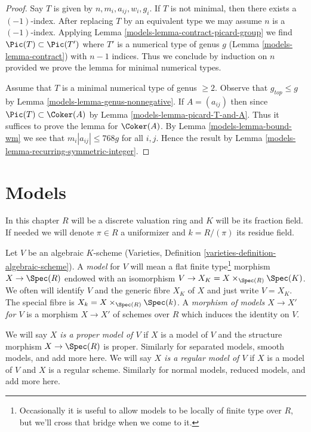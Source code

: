 \begin{proof}

Say $T$ is given by $n, m_i, a_{ij}, w_i, g_i$.
If $T$ is not minimal, then there exists a $(-1)$-index.
After replacing $T$ by an equivalent type we may assume
$n$ is a $(-1)$-index. Applying Lemma \ref{models-lemma-contract-picard-group}
we find $\Pic(T) \subset \Pic(T')$ where $T'$
is a numerical type of genus $g$ (Lemma \ref{models-lemma-contract})
with $n - 1$ indices. Thus we conclude by induction on $n$
provided we prove the lemma for minimal numerical types.

\medskip\noindent
Assume that $T$ is a minimal numerical type of genus $\geq 2$.
Observe that $g_{top} \leq g$ by Lemma \ref{models-lemma-genus-nonnegative}.
If $A = (a_{ij})$ then since $\Pic(T) \subset \Coker(A)$
by Lemma \ref{models-lemma-picard-T-and-A}. Thus it suffices to prove
the lemma for $\Coker(A)$.
By Lemma \ref{models-lemma-bound-wm} we see that $m_i|a_{ij}| \leq 768g$ for
all $i, j$.
Hence the result by Lemma \ref{models-lemma-recurring-symmetric-integer}.
\end{proof}

\section{Models}
\label{models-section-models}
In this chapter $R$ will be a discrete valuation ring and $K$ will
be its fraction field. If needed we will denote $\pi \in R$ a
uniformizer and $k = R/(\pi)$ its residue field.

\medskip\noindent
Let $V$ be an algebraic $K$-scheme
(Varieties, Definition \ref{varieties-definition-algebraic-scheme}).
A {\it model} for $V$ will
mean a flat finite type\footnote{Occasionally it is useful to
allow models to be locally of finite type over $R$, but we'll
cross that bridge when we come to it.}
morphism $X \to \Spec(R)$ endowed with
an isomorphism $V \to X_K = X \times_{\Spec(R)} \Spec(K)$. We often
will identify $V$ and the generic fibre $X_K$ of $X$ and
just write $V = X_K$.
The special fibre is $X_k = X \times_{\Spec(R)} \Spec(k)$.
A {\it morphism of models $X \to X'$ for $V$}
is a morphism $X \to X'$ of schemes over $R$ which induces
the identity on $V$.

\medskip\noindent
We will say {\it $X$ is a proper model of $V$} if $X$ is a model
of $V$ and the structure morphism $X \to \Spec(R)$ is proper.
Similarly for separated models, smooth models, and add more here.
We will say {\it $X$ is a regular model of $V$} if $X$ is a model
of $V$ and $X$ is a regular scheme.
Similarly for normal models, reduced models, and add more here.

